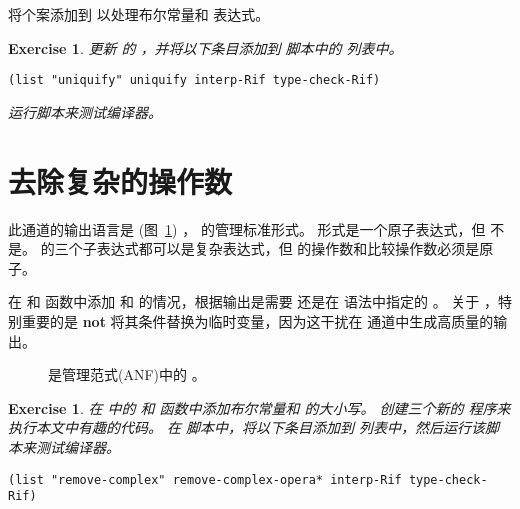 \documentclass[11pt]{book}
\newcommand{\gray}[1]{{\color{gray} #1}}
\newtheorem{exercise}[theorem]{Exercise}
\begin{document}
将个案添加到  以处理布尔常量和
 表达式。

\begin{exercise}\normalfont
更新 \LangIf{} 的  ，并将以下条目添加到  脚本中的  列表中。
\begin{lstlisting}
(list "uniquify" uniquify interp-Rif type-check-Rif)
\end{lstlisting}
运行脚本来测试编译器。
\end{exercise}

\section{去除复杂的操作数}
\label{sec:remove-complex-opera-Rif}

此通道的输出语言是 \LangIfANF{}
(图~\ref{fig:Rif-anf-syntax}) ，
\LangIf{} 的管理标准形式。  形式是一个原子表达式，但
 不是。  的三个子表达式都可以是复杂表达式，但  的操作数和比较操作数必须是原子。

在  和
 函数中添加  和  的情况，根据输出是需要
\Exp{} 还是在 \LangIfANF{} 语法中指定的 \Atm{} 。
关于  ，特别重要的是 \textbf{not}
将其条件替换为临时变量，因为这干扰在
 通道中生成高质量的输出。

\begin{figure}[tp]
\centering
\fbox{
\begin{minipage}{0.96\textwidth}
\[
\begin{array}{rcl}
\Atm &::=& \gray{ \INT{\Int} \mid \VAR{\Var} } \mid \BOOL{\itm{bool}}\\
\Exp &::=& \gray{ \Atm \mid \READ{} } \\
     &\mid& \gray{ \NEG{\Atm} \mid \ADD{\Atm}{\Atm} } \\
     &\mid& \gray{ \LET{\Var}{\Exp}{\Exp} } \\
     &\mid& \UNIOP{\key{not}}{\Atm} \\
      &\mid& \BINOP{\itm{cmp}}{\Atm}{\Atm} \mid \IF{\Exp}{\Exp}{\Exp} \\
R^{\dagger}_2  &::=& \PROGRAM{\code{()}}{\Exp}
\end{array}
\]
\end{minipage}
}
\caption{\LangIfANF{} 是管理范式(ANF)中的 \LangIf{} 。}
\label{fig:Rif-anf-syntax}
\end{figure}


\begin{exercise}\normalfont
%
在  中的 
和  函数中添加布尔常量和  的大小写。
%
创建三个新的 \LangInt{} 程序来执行本文中有趣的代码。
%
在  脚本中，将以下条目添加到  列表中，然后运行该脚本来测试编译器。
\begin{lstlisting}
(list "remove-complex" remove-complex-opera* interp-Rif type-check-Rif)
\end{lstlisting}
\end{exercise}
\end{document}
